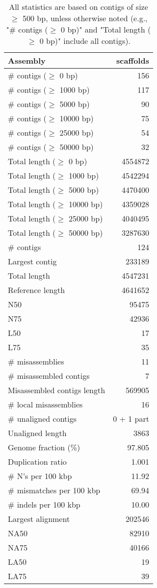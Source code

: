 \documentclass[12pt,a4paper]{article}
\begin{document}
\begin{table}[ht]
\begin{center}
\caption{All statistics are based on contigs of size $\geq$ 500 bp, unless otherwise noted (e.g., "\# contigs ($\geq$ 0 bp)" and "Total length ($\geq$ 0 bp)" include all contigs).}
\begin{tabular}{|l*{1}{|r}|}
\hline
Assembly & scaffolds \\ \hline
\# contigs ($\geq$ 0 bp) & 156 \\ \hline
\# contigs ($\geq$ 1000 bp) & 117 \\ \hline
\# contigs ($\geq$ 5000 bp) & 90 \\ \hline
\# contigs ($\geq$ 10000 bp) & 75 \\ \hline
\# contigs ($\geq$ 25000 bp) & 54 \\ \hline
\# contigs ($\geq$ 50000 bp) & 32 \\ \hline
Total length ($\geq$ 0 bp) & 4554872 \\ \hline
Total length ($\geq$ 1000 bp) & 4542294 \\ \hline
Total length ($\geq$ 5000 bp) & 4470400 \\ \hline
Total length ($\geq$ 10000 bp) & 4359028 \\ \hline
Total length ($\geq$ 25000 bp) & 4040495 \\ \hline
Total length ($\geq$ 50000 bp) & 3287630 \\ \hline
\# contigs & 124 \\ \hline
Largest contig & 233189 \\ \hline
Total length & 4547231 \\ \hline
Reference length & 4641652 \\ \hline
N50 & 95475 \\ \hline
N75 & 42936 \\ \hline
L50 & 17 \\ \hline
L75 & 35 \\ \hline
\# misassemblies & 11 \\ \hline
\# misassembled contigs & 7 \\ \hline
Misassembled contigs length & 569905 \\ \hline
\# local misassemblies & 16 \\ \hline
\# unaligned contigs & 0 + 1 part \\ \hline
Unaligned length & 3863 \\ \hline
Genome fraction (\%) & 97.805 \\ \hline
Duplication ratio & 1.001 \\ \hline
\# N's per 100 kbp & 11.92 \\ \hline
\# mismatches per 100 kbp & 69.94 \\ \hline
\# indels per 100 kbp & 10.00 \\ \hline
Largest alignment & 202546 \\ \hline
NA50 & 82910 \\ \hline
NA75 & 40166 \\ \hline
LA50 & 19 \\ \hline
LA75 & 39 \\ \hline
\end{tabular}
\end{center}
\end{table}
\end{document}
